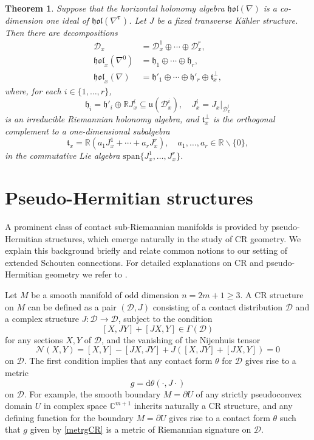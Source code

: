 \documentclass{amsart}
\theoremstyle{plain}
\newtheorem{theorem}{Theorem}[section]
\theoremstyle{definition}
\def\u{\mathfrak{u}}
\def\t{\mathfrak{t}}
\newcommand{\h}{\mathfrak{h}}
\newcommand{\hol}{\mathfrak{hol}}
\newcommand{\bt}{{\boldsymbol{\tau}}}
\newcommand{\Real}{\mathbb{R}}
\newcommand{\1}{\mathbf{1}}
\newcommand{\D}{{\mathcal D}}
\renewcommand{\d}{\mathrm{d}}
\newcommand{\+}{\oplus}
\begin{document}
\begin{theorem}\label{thholnablaKcontact} 
	Suppose that the horizontal holonomy algebra  $\hol(\nabla)$ is a co-dimension one  ideal of  $\hol(\nabla^\bt)$. Let $J$ be a fixed transverse K\"ahler structure. Then there are decompositions \begin{align}\label{deRD1}  \D_x&=\D_x^1\oplus\cdots\oplus \D_x^r,\\
	\label{deRh1}\hol_x(\nabla^{0})&=\h_1\oplus\cdots\oplus \h_r,\\
	\label{deRh2}\hol_x(\nabla)&=\h'_1\oplus\cdots\oplus\h'_r\oplus\mathfrak{t}_x^\bot,\end{align} where, for each $i\in\{1,\dots,r\}$, 
	$$\h_i=\h'_i\oplus \Real J_x^i \subseteq\u(\D^i_x),\quad J_x^i={J_x}|_{\D^i_x}$$ is  an irreducible Riemannian holonomy algebra, and $\mathfrak{t}^\bot_x$ is the orthogonal complement to a one-dimensional subalgebra
	$$\t_x=\Real (a_1 J_x^1+\cdots +a_r J_x^r), \quad a_1,\dots,a_r\in\Real\backslash\{0\},$$
	in the commutative Lie algebra $\mathrm{span}\{J_x^1,\dots,J_x^r\}$.
\end{theorem}	













\section{Pseudo-Hermitian structures}\label{secPsHerm} %



A prominent class of contact sub-Riemannian manifolds is provided by pseudo-Hermitian structures, which
emerge naturally in  the study of CR geometry. We explain this background briefly and 
relate common notions to our setting of extended Schouten connections. For detailed explanations on CR and 
pseudo-Hermitian geometry we refer to \cite{Tanaka,DT2006}.


Let $M$ be a smooth manifold of odd dimension $n=2m+1\geq 3$. A CR structure on $M$ can be defined as a pair $(\D,J)$ consisting 
of a contact distribution $\D$ and a complex structure $J:\D\to \D$, subject to the condition $$[X,JY]+[JX,Y]\in \Gamma(\D)$$ for any 
sections $X,Y$ of $\D$, and the vanishing of the Nijenhuis tensor
$$\mathcal{N}(X,Y)=[X,Y]-[JX,JY]+J([X,JY]+[JX,Y])=0$$ on $\D$. 
The first condition implies 
that any contact form $\theta$ for $\D$ gives rise
to a metric \begin{equation}\label{metrgCR} g=\d\theta(\cdot,J\cdot)\end{equation} on $\D$. For example, the smooth boundary
$M=\partial U$ of any strictly pseudoconvex domain $U$ in complex space $\mathbb{C}^{m+1}$ 
inherits naturally  a CR structure, and any defining function for the boundary $M=\partial U$ gives 
rise to a contact form $\theta$ such that $g$ given by \eqref{metrgCR} is a metric of Riemannian signature on $\D$. 
\end{document}
